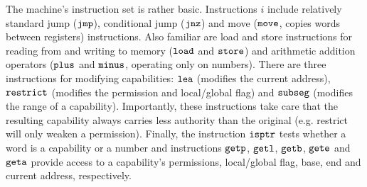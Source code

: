 \documentclass[compsoc,conference,letterpaper,fleqn]{IEEEtran}
\newcommand{\zinstr}[1]{\mathtt{#1}}
\newcommand{\oneinstr}[2]{
  \ifthenelse{\equal{#2}{}}
  {\zinstr{#1}}
  {\zinstr{#1} \; #2}
}
\newcommand{\jmp}[1]{\oneinstr{jmp}{#1}}
\newcommand{\twoinstr}[3]{
  \ifthenelse{\equal{#2#3}{}}
  {\zinstr{#1}}
  {\zinstr{#1} \; #2 \; #3}
}
\newcommand{\restricttwo}[2]{\twoinstr{restrict}{#1}{#2}}
\newcommand{\jnz}[2]{\twoinstr{jnz}{#1}{#2}}
\newcommand{\isptr}[2]{\twoinstr{isptr}{#1}{#2}}
\newcommand{\geta}[2]{\twoinstr{geta}{#1}{#2}}
\newcommand{\getb}[2]{\twoinstr{getb}{#1}{#2}}
\newcommand{\gete}[2]{\twoinstr{gete}{#1}{#2}}
\newcommand{\getp}[2]{\twoinstr{getp}{#1}{#2}}
\newcommand{\getl}[2]{\twoinstr{getl}{#1}{#2}}
\newcommand{\move}[2]{\twoinstr{move}{#1}{#2}}
\newcommand{\store}[2]{\twoinstr{store}{#1}{#2}}
\newcommand{\load}[2]{\twoinstr{load}{#1}{#2}}
\newcommand{\lea}[2]{\twoinstr{lea}{#1}{#2}}
\newcommand{\threeinstr}[4]{
  \ifthenelse{\equal{#2#3#4}{}}
  {\zinstr{#1}}
  {\zinstr{#1} \; #2 \; #3 \; #4}
}
\newcommand{\subseg}[3]{\threeinstr{subseg}{#1}{#2}{#3}}
\newcommand{\plus}[3]{\threeinstr{plus}{#1}{#2}{#3}}
\newcommand{\minus}[3]{\threeinstr{minus}{#1}{#2}{#3}}
\begin{document}
The machine's instruction set is rather basic. Instructions $i$ include
relatively standard jump ($\jmp{}$), conditional jump ($\jnz{}{}$) and move
($\move{}{}$, copies words between registers) instructions. Also familiar are
load and store instructions for reading from and writing to memory ($\load{}{}$
and $\store{}{}$) and arithmetic addition operators ($\plus{}{}{}$ and
$\minus{}{}{}$, operating only on numbers). There are three instructions for
modifying capabilities: $\lea{}{}$ (modifies the current address),
$\restricttwo{}{}$ (modifies the permission and local/global flag) and
$\subseg{}{}{}$ (modifies the range of a capability). Importantly, these
instructions take care that the resulting capability always carries less
authority than the original (e.g. restrict will only weaken a permission).
Finally, the instruction $\isptr{}{}$ tests whether a word is a capability or a
number and instructions $\getp{}{}$, $\getl{}{}$, $\getb{}{}$, $\gete{}{}$ and
$\geta{}{}$ provide access to a capability's permissions, local/global flag, base,
end and current address, respectively.
\end{document}
